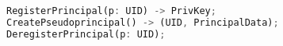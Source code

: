 \begin{figure}[t]
\begin{lstlisting}[language=Rust, style=rust]
RegisterPrincipal(p: UID) -> PrivKey;
CreatePseudoprincipal() -> (UID, PrincipalData);
DeregisterPrincipal(p: UID);


\end{lstlisting}
\end{figure}
